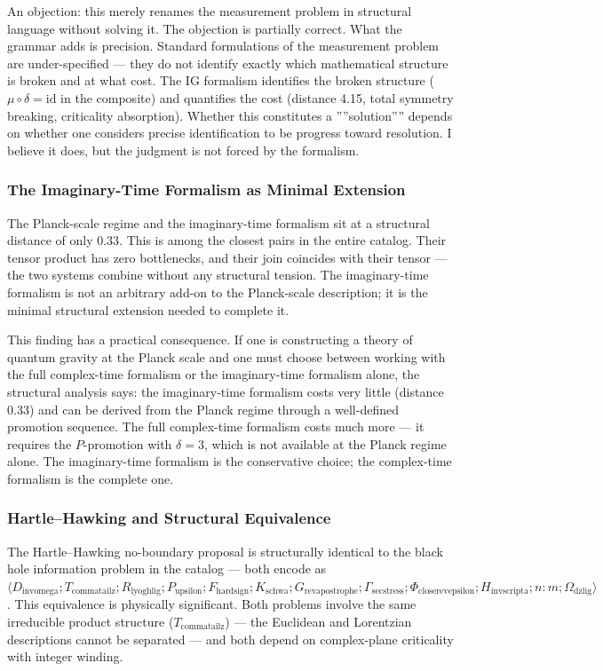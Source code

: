 \documentclass[12pt,a4paper]{article}
\begin{document}
An objection: this merely renames the measurement problem in structural language without solving it. The objection is partially correct. What the grammar adds is precision. Standard formulations of the measurement problem are under-specified --- they do not identify exactly which mathematical structure is broken and at what cost. The IG formalism identifies the broken structure ($\mu \circ \delta = \text{id}$ in the composite) and quantifies the cost (distance 4.15, total symmetry breaking, criticality absorption). Whether this constitutes a ''''solution'''' depends on whether one considers precise identification to be progress toward resolution. I believe it does, but the judgment is not forced by the formalism.

\subsubsection{The Imaginary-Time Formalism as Minimal Extension}

The Planck-scale regime and the imaginary-time formalism sit at a structural distance of only 0.33. This is among the closest pairs in the entire catalog. Their tensor product has zero bottlenecks, and their join coincides with their tensor --- the two systems combine without any structural tension. The imaginary-time formalism is not an arbitrary add-on to the Planck-scale description; it is the minimal structural extension needed to complete it.

This finding has a practical consequence. If one is constructing a theory of quantum gravity at the Planck scale and one must choose between working with the full complex-time formalism or the imaginary-time formalism alone, the structural analysis says: the imaginary-time formalism costs very little (distance 0.33) and can be derived from the Planck regime through a well-defined promotion sequence. The full complex-time formalism costs much more --- it requires the $P$-promotion with $\delta = 3$, which is not available at the Planck regime alone. The imaginary-time formalism is the conservative choice; the complex-time formalism is the complete one.

\subsubsection{Hartle--Hawking and Structural Equivalence}

The Hartle--Hawking no-boundary proposal is structurally identical to the black hole information problem in the catalog --- both encode as $\langle D_{\text{invomega}}; T_{\text{commatailz}}; R_{\text{lyoghlig}}; P_{\text{upsilon}}; F_{\text{hardsign}}; K_{\text{schwa}}; G_{\text{revapostrophe}}; \Gamma_{\text{secstress}}; \Phi_{\text{closerevepsilon}}; H_{\text{invscripta}}; n{:}m; \Omega_{\text{dzlig}} \rangle$. This equivalence is physically significant. Both problems involve the same irreducible product structure ($T_{\text{commatailz}}$) --- the Euclidean and Lorentzian descriptions cannot be separated --- and both depend on complex-plane criticality with integer winding.
\end{document}

